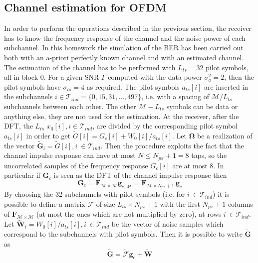 \documentclass[10pt]{article}
\newcommand{\ofdM} {\mathcal{M}}
\newcommand{\DFTmat} {\mathcal{\mathbf{F}}}
\begin{document}
\subsection*{Channel estimation for OFDM}
In order to perform the operations described in the previous section, the receiver has to know the frequency response of the channel and the noise power of each subchannel. In this homework the simulation of the BER has been carried out both with an a-priori perfectly known channel and with an estimated channel. 
The estimation of the channel has to be performed with $L_{ts} = 32$ pilot symbols, all in block $0$. For a given SNR $\Gamma$ computed with the data power $\sigma_a^2 = 2$, then the pilot symbols have $\sigma_{ts} = 4$ as required. The pilot symbols $a_{ts}[i]$ are inserted in the subchannels $i \in \mathcal{T}_{ind} = \{ 0, 15, 31, \dots, 497 \}$, i.e. with a spacing of $\ofdM/L_{ts}$ subchannels between each other. The other $\ofdM - L_{ts}$ symbols can be data or anything else, they are not used for the estimation. At the receiver, after the DFT, the $L_{ts}$ $x_0[i], i \in \mathcal{T}_{ind}$, are divided by the corresponding pilot symbol $a_{ts}[i]$ in order to get $\tilde{G}[i] = G_c[i] + W_0[i]/a_{ts}[i]$. Let $\boldsymbol{\Omega}$ be a realization of the vector $\tilde{\mathbf{G}}_i = \tilde{G}[i], i\ \in \mathcal{T}_{ind}$. 
Then the procedure exploits the fact that the channel impulse response can have at most $N \le N_{px} + 1 = 8$ taps, so the uncorrelated samples of the frequency response $G_c[i]$ are at most 8. In particular if $\mathbf{G}_c$ is seen as the DFT of the channel impulse response then
\begin{equation}
	\mathbf{G}_c = \DFTmat_{\ofdM \times \ofdM} \mathbf{g}_{c,\ofdM} = \DFTmat_{\ofdM \times N_{px} + 1} \, \mathbf{g}_c
\end{equation}
By choosing the 32 subchannels with pilot symbols (i.e. for $ i\ \in \mathcal{T}_{ind}$) it is possible to define a matrix $\boldsymbol{\tilde{\mathcal{F}}}$ of size $L_{ts} \times N_{px} + 1$ with the first $N_{px} + 1$ columns of $\DFTmat_{\ofdM \times \ofdM}$ (at most the ones which are not multiplied by zero), at rows $ i\ \in \mathcal{T}_{ind} $. Let $\tilde{\mathbf{W}}_i = W_0[i]/a_{ts}[i], i\ \in \mathcal{T}_{ind}$ be the vector of noise samples which correspond to the subchannels with pilot symbols. Then it is possible to write $\mathbf{\tilde{G}}$ as
\begin{equation}
	\mathbf{\tilde{G}} = \boldsymbol{\tilde{\mathcal{F}}}\mathbf{g}_{c} + \tilde{\mathbf{W}}
\end{equation}
\end{document}
